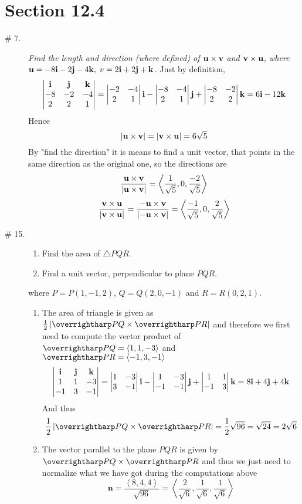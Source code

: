 \documentclass[8pt]{article} %
\begin{document}
\section{Section 12.4}
\begin{description}
	\item[\# 7.]{{\it Find the length and direction (where defined) of $\mathbf{u}\times\mathbf{v}$ and $\mathbf{v}\times\mathbf{u}$, where $\mathbf{u}=
		-8\mathbf{i}-2\mathbf{j}-4\mathbf{k},\;v=2\mathbf{i}+2\mathbf{j}+\mathbf{k}$.
		}
		Just by definition,
		\[\begin{vmatrix}\mathbf{i}&\mathbf{j}&\mathbf{k}\\-8&-2&-4\\2&2&1\end{vmatrix}= \begin{vmatrix}-2&-4\\2&1\end{vmatrix}\mathbf{i} -\begin{vmatrix}-8&-4\\2&1\end{vmatrix}\mathbf{j} +\begin{vmatrix}-8&-2\\2&2\end{vmatrix}\mathbf{k}=6\mathbf{i}-12\mathbf{k}\]
		Hence \[\left|\mathbf{u}\times\mathbf{v}\right|=\left|\mathbf{v}\times\mathbf{u}\right|=6\sqrt{5}\]
		By "find the direction" it is means to find a unit vector, that points in the same direction as the original one, so the
		directions are
		\[\frac{\mathbf{u}\times\mathbf{v}}{\left|\mathbf{u}\times\mathbf{v}\right|}=\left<\frac{1}{\sqrt{5}},0,\frac{-2}{\sqrt{5}}\right>\]
		\[\frac{\mathbf{v}\times\mathbf{u}}{\left|\mathbf{v}\times\mathbf{u}\right|}=\frac{-\mathbf{u}\times\mathbf{v}}{\left|-\mathbf{u}\times\mathbf{v}\right|}=\left<\frac{-1}{\sqrt{5}},0,
		\frac{2}{\sqrt{5}}\right>\]
		}
	\item[\# 15.]{{\it \begin{enumerate}[label=\bfseries\alph*.]
			\item{Find the area of $\triangle PQR$.
				}
			\item{Find a unit vector, perpendicular to plane $PQR$.}
			\end{enumerate}
			where $P=P(1,-1,2)$, $Q=Q(2,0,-1)$ and $R=R(0,2,1)$.
		}
		\begin{enumerate}[label=\bfseries\alph*.]
			\item{The area of triangle is given as $\frac{1}{2}\myabs{\myvec{PQ}\times\myvec{PR}}$ and therefore we first
				need to compute the vector product of $\myvec{PQ}=\left<1,1,-3\right>$ and $\myvec{PR}=\left<
				-1,3,-1\right>$
				\[
				\begin{vmatrix}\mathbf{i}&\mathbf{j}&\mathbf{k}\\1&1&-3\\-1&3&-1\end{vmatrix}= \begin{vmatrix}1&-3\\3&-1\end{vmatrix}\mathbf{i} -\begin{vmatrix}1&-3\\-1&-1\end{vmatrix}\mathbf{j} +\begin{vmatrix}1&1\\-1&3\end{vmatrix}\mathbf{k}=8\mathbf{i}+4\mathbf{j}+4\mathbf{k}
				\]
				And thus
				\[\frac{1}{2}\myabs{\myvec{PQ}\times\myvec{PR}}=\frac{1}{2}\sqrt{96}=\sqrt{24}=2\sqrt{6}\]
				}
			\item{The vector parallel to the plane $PQR$ is given by $\myvec{PQ}\times\myvec{PR}$ and thus we just need
				to normalize what we have got during the computations above
				\[\mathbf{n}=\frac{\left<8,4,4\right>}{\sqrt{96}}=\left<\frac{2}{\sqrt{6}},\frac{1}{\sqrt{6}},\frac{1}{\sqrt{6}}
				\right>\]
				}
		\end{enumerate}
		}
\end{description}
\end{document}
